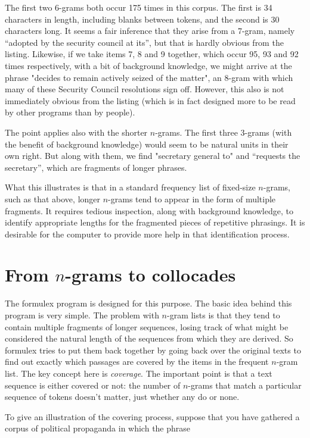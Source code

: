 \documentclass[output=paper]{langscibook}
\begin{document}
The first two 6-grams both occur 175 times in this corpus. The first is 34 characters in length, including blanks between tokens, and the second is 30 characters long. It seems a fair inference that they arise from a 7-gram, namely ``adopted by the security council at its'', but that is hardly obvious from the listing. Likewise, if we take items 7, 8 and 9 together, which occur 95, 93 and 92 times respectively, with a bit of background knowledge, we might arrive at the phrase "decides to remain actively seized of the matter", an 8-gram with which many of these Security Council resolutions sign off. However, this also is not immediately obvious from the listing (which is in fact designed more to be read by other programs than by people).

The point applies also with the shorter $n$-grams. The first three 3-grams (with the benefit of background knowledge) would seem to be natural units in their own right. But along with them, we find "secretary general to" and ``requests the secretary'', which are fragments of longer phrases.

What this illustrates is that in a standard frequency list of fixed-size $n$-grams, such as that above, longer $n$-grams tend to appear in the form of multiple fragments. It requires tedious inspection, along with background knowledge, to identify appropriate lengths for the fragmented pieces of repetitive phrasings. It is desirable for the computer to provide more help in that identification process.

\section{From $n$-grams to collocades}

The formulex program is designed for this purpose. The basic idea behind this program is very simple. The problem with $n$-gram lists is that they tend to contain multiple fragments of longer sequences, losing track of what might be considered the natural length of the sequences from which they are derived. So formulex tries to put them back together by going back over the original texts to find out exactly which passages are covered by the items in the frequent $n$-gram list. The key concept here is \textit{coverage}. The important point is that a text sequence is either covered or not: the number of $n$-grams that match a particular sequence of tokens doesn't matter, just whether any do or none.

To give an illustration of the covering process, suppose that you have gathered a corpus of political propaganda in which the phrase
\end{document}
